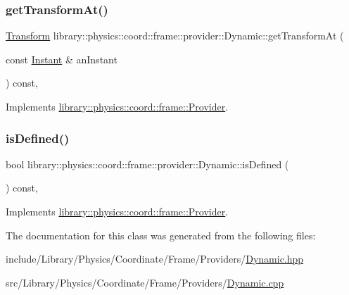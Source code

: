 \subsubsection{\texorpdfstring{get\+Transform\+At()}{getTransformAt()}}
{\footnotesize\ttfamily \hyperlink{classlibrary_1_1physics_1_1coord_1_1_transform}{Transform} library\+::physics\+::coord\+::frame\+::provider\+::\+Dynamic\+::get\+Transform\+At (\begin{DoxyParamCaption}\item[{const \hyperlink{classlibrary_1_1physics_1_1time_1_1_instant}{Instant} \&}]{an\+Instant }\end{DoxyParamCaption}) const\hspace{0.3cm}{\ttfamily [override]}, {\ttfamily [virtual]}}



Implements \hyperlink{classlibrary_1_1physics_1_1coord_1_1frame_1_1_provider_a796fd2dd337f1304a0e9acf573ce2550}{library\+::physics\+::coord\+::frame\+::\+Provider}.

\mbox{\label{classlibrary_1_1physics_1_1coord_1_1frame_1_1provider_1_1_dynamic_a0527b3fd86cdd8070f1697c057f06479}} 
\subsubsection{\texorpdfstring{is\+Defined()}{isDefined()}}
{\footnotesize\ttfamily bool library\+::physics\+::coord\+::frame\+::provider\+::\+Dynamic\+::is\+Defined (\begin{DoxyParamCaption}{ }\end{DoxyParamCaption}) const\hspace{0.3cm}{\ttfamily [override]}, {\ttfamily [virtual]}}



Implements \hyperlink{classlibrary_1_1physics_1_1coord_1_1frame_1_1_provider_ae7cd093febf2b20f71400f9f79442774}{library\+::physics\+::coord\+::frame\+::\+Provider}.



The documentation for this class was generated from the following files\+:\begin{DoxyCompactItemize}
\item 
include/\+Library/\+Physics/\+Coordinate/\+Frame/\+Providers/\hyperlink{_dynamic_8hpp}{Dynamic.\+hpp}\item 
src/\+Library/\+Physics/\+Coordinate/\+Frame/\+Providers/\hyperlink{_dynamic_8cpp}{Dynamic.\+cpp}\end{DoxyCompactItemize}

